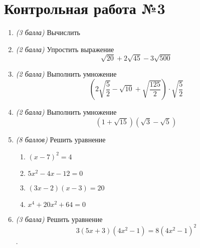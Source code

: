 \documentclass[12pt, a4paper]{article}
\begin{document}
\section*{Контрольная работа №3}
\begin{enumerate}
	\item \textit{(3 балла)} Вычислить
	\begin{enumerate}[label=\asbuk*)]
	\end{enumerate}
	\item \textit{(2 балла)} Упростить выражение $$\sqrt{20}+2\sqrt{45}-3\sqrt{500}$$
	\item \textit{(2 балла)} Выполнить умножение $$\left(2\sqrt{\dfrac{5}{2}}-\sqrt{10}+\sqrt{\dfrac{125}{2}}\right)\cdot\sqrt{\dfrac{5}{2}}$$
	\item \textit{(2 балла)} Выполнить умножение $$(1+\sqrt{15})(\sqrt{3}-\sqrt{5})$$
	\item \textit{(8 баллов)} Решить уравнение
	\begin{enumerate}[label=\asbuk*)]
		\item $(x-7)^2=4$
		\item $5x^2-4x-12=0$
		\item $(3x-2)(x-3)=20$
		\item $x^4+20x^2+64=0$
	\end{enumerate}
	\item \textit{(3 балла)} Решить уравнение $$3(5x+3)(4x^2-1)=8(4x^2-1)^2$$.
\end{enumerate}
\end{document}
